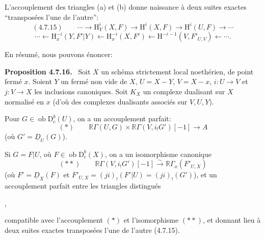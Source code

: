 \documentclass[11pt]{article}
\newenvironment{statement}[1]{\par\medskip\noindent\textbf{#1.}\ }{\par\medskip}
\renewcommand{\H}{\mathrm{H}}
\newcommand{\R}{\mathbb{R}}\newcommand{\RHomCore}{\mathbb{R}\mathrm{Hom}}
\newcommand{\D}{\mathrm{D}}
\newcommand{\ob}{\operatorname{ob}}
\providecommand{\ob}{\operatorname{ob}}
\providecommand{\R}{\mathrm R}
\begin{document}
L'accouplement des triangles (a) et (b) donne naissance à deux suites exactes ``transposées l'une de l'autre'':
\[
(4.7.15)\qquad \cdots\longrightarrow \H_Y^i(X,F)\longrightarrow\H^i(X,F)\longrightarrow\H^i(U,F)\longrightarrow\cdots
\]
\[
\cdots\longleftarrow \H_x^{-i}(Y,F'|Y)\longleftarrow\H_x^{-i}(X,F')\longleftarrow\H^{-i-1}(V,F'_{U,V})\longleftarrow\cdots.
\]

En résumé, nous pouvons énoncer:

\begin{statement}{Proposition 4.7.16}
Soit $X$ un schéma strictement local noethérien, de point fermé $x$. Soient $Y$ un fermé non vide de $X$, $U=X-Y$, $V=X-x$, $i:U\to V$ et $j:V\to X$ les inclusions canoniques. Soit $K_X$ un complexe dualisant sur $X$ normalisé en $x$ (d'où des complexes dualisants associés sur $V,U,Y$).

Pour $G\in\ob\D_c^b(U)$, on a un accouplement parfait:
\[
(*)\qquad \R\Gamma(U,G)\times\R\Gamma(V,i_!G')[-1]\longrightarrow A
\]
(où $G'=\underline{D}_U(G)$).

Si $G=F|U$, où $F\in\ob\D_c^b(X)$, on a un isomorphisme canonique
\[
(**)\qquad \R\Gamma(V,i_!G')[-1]\xrightarrow{\sim}\R\Gamma_x(F'_{U,X})
\]
(où $F'=\underline{D}_X(F)$ et $F'_{U,X}=(ji)_!(F'|U)=(ji)_!(G')$), et un accouplement parfait entre les triangles distingués
\begin{center}
\quad ,
\end{center}
compatible avec l'accouplement $(*)$ et l'isomorphisme $(**)$, et donnant lieu à deux suites exactes transposées l'une de l'autre (4.7.15).
\end{statement}
\end{document}
